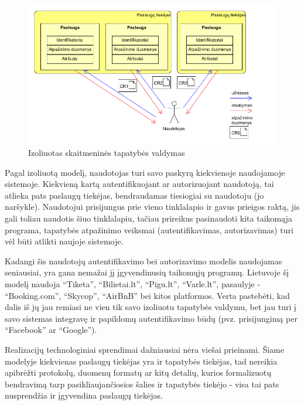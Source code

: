 \begin{figure}[H]
    \centering
    \includegraphics[scale=0.65]{img/IsolatedModel}
    \caption{Izoliuotas skaitmeninės tapatybės valdymas \cite{Cao2010}}
\end{figure}

Pagal izoliuotą modelį, naudotojas turi savo paskyrą kiekvienoje naudojamoje sistemoje. Kiekvieną kartą autentifikuojant ar autorizuojant
naudotoją, tai atlieka pats paslaugų tiekėjas, bendraudamas tiesiogiai su naudotoju (jo naršykle). Naudotojui prisijungus prie vieno tinklalapio ir gavus
prieigos raktą, jis gali toliau naudotis šiuo tinklalapiu, tačiau prireikus pasinaudoti kita taikomąja programa, tapatybės atpažinimo veiksmai (autentifikavimas, autorizavimas)
turi vėl būti atlikti naujoje sistemoje.


Kadangi šis naudotojų autentifikavimo bei autorizavimo modelis naudojamas seniausiai,
yra gana nemažai jį įgyvendinusių taikomųjų programų. Lietuvoje šį modelį naudoja
\enquote{Tiketa}, \enquote{Bilietai.lt}, \enquote{Pigu.lt},
\enquote{Varle.lt}, pasaulyje - \enquote{Booking.com}, \enquote{Skycop}, \enquote{AirBnB} bei kitos platformos. Verta
pastebėti, kad dalis iš jų jau remiasi ne vien tik savo izoliuotu tapatybės valdymu, bet jau turi į savo sistemas integravę ir papildomų autentifikavimo būdų
(pvz. prisijungimą per \enquote{Facebook} ar \enquote{Google}).

Realizacijų technologiniai sprendimai dažniausiai nėra viešai prieinami.
Šiame modelyje kiekvienas paslaugų tiekėjas yra ir tapatybės tiekėjas, tad nereikia
apibrėžti protokolų, duomenų formatų ar kitų detalių, kurios formalizuotų bendravimą tarp pasikliaujančiosios šalies ir
tapatybės tiekėjo - visa tai pats nusprendžia ir įgyvendina paslaugų tiekėjas.

